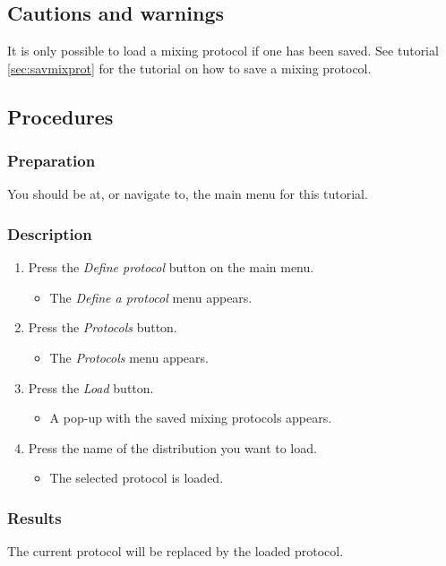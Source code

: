 \subsection{Cautions and warnings}
It is only possible to load a mixing protocol if one has been saved. See tutorial \ref{sec:savmixprot} for the tutorial on how to save a mixing protocol.

\subsection{Procedures}
\subsubsection{Preparation}
You should be at, or navigate to, the main menu for this tutorial.

\subsubsection{Description}
\begin{enumerate}
	\item Press the \emph{Define protocol} button on the main menu.
		\begin{itemize}
            \item The \emph{Define a protocol} menu appears.
		\end{itemize}
	\item Press the \emph{Protocols} button.
		\begin{itemize}
             \item The \emph{Protocols} menu appears.
		\end{itemize}
	\item Press the \emph{Load} button.
		\begin{itemize}
            \item A pop-up with the saved mixing protocols appears.
		\end{itemize}
    \item Press the name of the distribution you want to load.
   		\begin{itemize}
            \item The selected protocol is loaded.
		\end{itemize}
\end{enumerate}

\subsubsection{Results}
The current protocol will be replaced by the loaded protocol.

